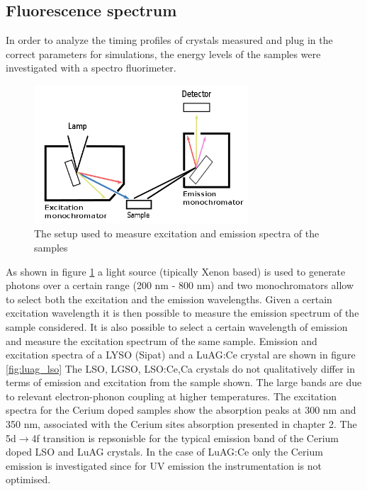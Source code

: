 \subsection{Fluorescence spectrum}
In order to analyze the timing profiles of crystals measured and plug in the correct parameters for simulations, 
the energy levels of the samples were investigated with a spectro fluorimeter.
\begin{figure}[htbp]
\begin{center}
\includegraphics[width=8cm]{../Pictures/Chapter_5/fluo.png}
\end{center}
\caption[Spectro fluorimeter]{The setup used to measure excitation and emission spectra of the samples}
\label{fig:emission}
\end{figure}
 
As shown in figure \ref{fig:emission} a light source (tipically Xenon based) is used to generate photons over a certain range (200 nm - 800 nm) and two monochromators allow to select both the excitation and the emission wavelengths. 
Given a certain excitation wavelength it is then possible to measure the emission spectrum of the sample considered.
It is also possible to select a certain wavelength of emission and measure the excitation spectrum of the same sample.
Emission and excitation spectra of a LYSO (Sipat) and a LuAG:Ce crystal are shown in figure \ref{fig:luag_lso}
The LSO, LGSO, LSO:Ce,Ca crystals do not qualitatively differ in terms of emission and excitation from the sample shown. 
The large bands are due to relevant electron-phonon coupling at higher temperatures.
The excitation spectra for the Cerium doped samples show the absorption peaks at 300 nm and 350 nm, associated with the Cerium sites absorption presented in chapter 2. The 5d$\rightarrow$4f transition is repsonisble for the typical emission band of the Cerium doped LSO and LuAG crystals. 
In the case of LuAG:Ce only the Cerium emission is investigated since for UV emission the instrumentation is not optimised.

